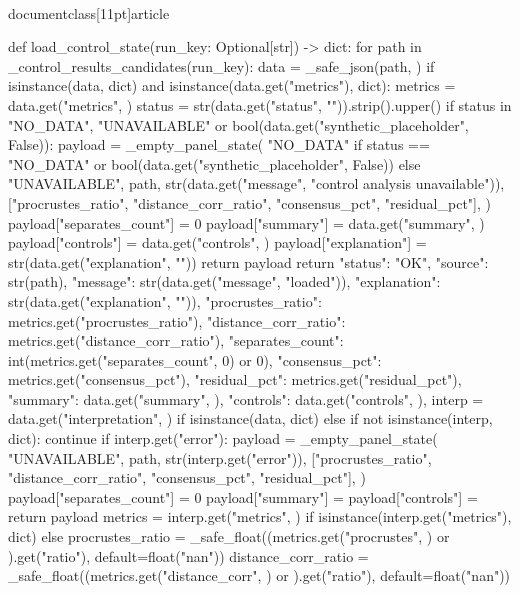 \\documentclass[11pt]{article}
\begin{document}
\begin{CodeBlock}
{def load_control_state(run_key: Optional[str]) -> dict:
    for path in _control_results_candidates(run_key):
        data = _safe_json(path, {})
        if isinstance(data, dict) and isinstance(data.get("metrics"), dict):
            metrics = data.get("metrics", {})
            status = str(data.get("status", "")).strip().upper()
            if status in {"NO_DATA", "UNAVAILABLE"} or bool(data.get("synthetic_placeholder", False)):
                payload = _empty_panel_state(
                    "NO_DATA" if status == "NO_DATA" or bool(data.get("synthetic_placeholder", False)) else "UNAVAILABLE",
                    path,
                    str(data.get("message", "control analysis unavailable")),
                    ["procrustes_ratio", "distance_corr_ratio", "consensus_pct", "residual_pct"],
                )
                payload["separates_count"] = 0
                payload["summary"] = data.get("summary", {})
                payload["controls"] = data.get("controls", {})
                payload["explanation"] = str(data.get("explanation", ""))
                return payload
            return {
                "status": "OK",
                "source": str(path),
                "message": str(data.get("message", "loaded")),
                "explanation": str(data.get("explanation", "")),
                "procrustes_ratio": metrics.get("procrustes_ratio"),
                "distance_corr_ratio": metrics.get("distance_corr_ratio"),
                "separates_count": int(metrics.get("separates_count", 0) or 0),
                "consensus_pct": metrics.get("consensus_pct"),
                "residual_pct": metrics.get("residual_pct"),
                "summary": data.get("summary", {}),
                "controls": data.get("controls", {}),
            }
        interp = data.get("interpretation", {}) if isinstance(data, dict) else {}
        if not isinstance(interp, dict):
            continue
        if interp.get("error"):
            payload = _empty_panel_state(
                "UNAVAILABLE",
                path,
                str(interp.get("error")),
                ["procrustes_ratio", "distance_corr_ratio", "consensus_pct", "residual_pct"],
            )
            payload["separates_count"] = 0
            payload["summary"] = {}
            payload["controls"] = {}
            return payload
        metrics = interp.get("metrics", {}) if isinstance(interp.get("metrics"), dict) else {}
        procrustes_ratio = _safe_float((metrics.get("procrustes", {}) or {}).get("ratio"), default=float("nan"))
        distance_corr_ratio = _safe_float((metrics.get("distance_corr", {}) or {}).get("ratio"), default=float("nan"))
}
\end{CodeBlock}
\end{document}
